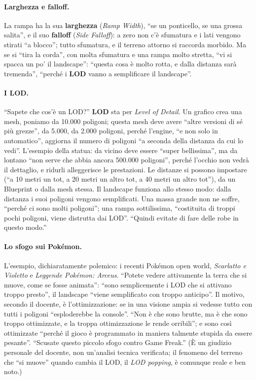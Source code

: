 \paragraph{Larghezza e falloff.} La rampa ha la sua \textbf{larghezza} (\emph{Ramp Width}),
``se un ponticello, se una grossa salita'', e il suo \textbf{falloff} (\emph{Side Falloff}):
a zero non c'è sfumatura e i lati vengono stirati ``a blocco''; tutto sfumatura, e il
terreno attorno si raccorda morbido. Ma se si ``tira la corda'', con molta sfumatura e una
rampa molto stretta, ``vi si spacca un po' il landscape'': ``questa cosa è molto rotta, e
dalla distanza sarà tremenda'', ``perché i \textbf{LOD} vanno a semplificare il landscape''.

\paragraph{I LOD.} ``Sapete che cos'è un LOD?'' \textbf{LOD} sta per \emph{Level of Detail}.
Un grafico crea una mesh, poniamo da 10.000 poligoni; questa mesh deve avere ``altre
versioni di sé più grezze'', da 5.000, da 2.000 poligoni, perché l'engine, ``e non solo in
automatico'', aggiorna il numero di poligoni ``a seconda della distanza da cui lo vedi''.
L'esempio della statua: da vicino deve essere ``super bellissima'', ma da lontano ``non serve
che abbia ancora 500.000 poligoni'', perché l'occhio non vedrà il dettaglio, e ridurli
alleggerisce le prestazioni. Le distanze si possono impostare (``a 10 metri un tot, a 20
metri un altro tot, a 40 metri un altro tot''), da un Blueprint o dalla mesh stessa. Il
landscape funziona allo stesso modo: dalla distanza i suoi poligoni vengono semplificati.
Una massa grande non ne soffre, ``perché ci sono molti poligoni''; una rampa sottilissima,
``costituita di troppi pochi poligoni, viene distrutta dai LOD''. ``Quindi evitate di fare
delle robe in questo modo.''

\paragraph{Lo sfogo sui Pokémon.} L'esempio, dichiaratamente polemico: i recenti Pokémon
open world, \emph{Scarlatto e Violetto} e \emph{Leggende Pokémon: Arceus}. ``Potete vedere
attivamente la terra che si muove, come se fosse animata'': ``sono semplicemente i LOD che si
attivano troppo presto'', il landscape ``viene semplificato con troppo anticipo''. Il
motivo, secondo il docente, è l'ottimizzazione: se in una visione ampia si vedesse tutto
con tutti i poligoni ``esploderebbe la console''. ``Non è che sono brutte, ma è che sono
troppo ottimizzate, e la troppa ottimizzazione le rende orribili''; e sono così ottimizzate
``perché il gioco è programmato in maniera talmente stupida da essere pesante''. ``Scusate
questo piccolo sfogo contro Game Freak.'' (È un giudizio personale del docente, non
un'analisi tecnica verificata; il fenomeno del terreno che ``si muove'' quando cambia il LOD,
il \emph{LOD popping}, è comunque reale e ben noto.)

